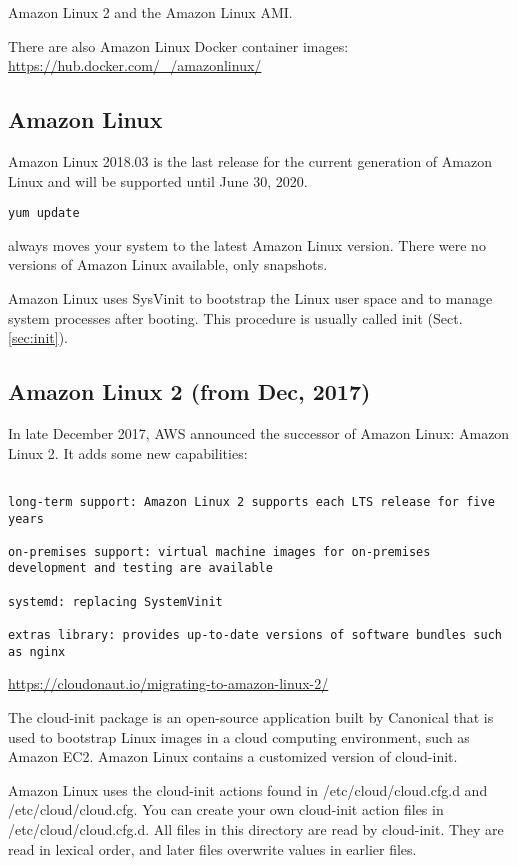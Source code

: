 Amazon Linux 2 and the Amazon Linux AMI. 

There are also  Amazon Linux Docker container images:
\url{https://hub.docker.com/_/amazonlinux/}

\subsection{Amazon Linux}

Amazon Linux 2018.03 is the last release for the current generation of Amazon
Linux and will be supported until June 30, 2020.

\begin{verbatim}
yum update 
\end{verbatim}
always moves your system to the latest Amazon Linux version.
There were no versions of Amazon Linux available, only snapshots.


Amazon Linux uses SysVinit to bootstrap the Linux user space and to manage
system processes after booting. This procedure is usually called init
(Sect.\ref{sec:init}).


\subsection{Amazon Linux 2 (from Dec, 2017)}

In late December 2017, AWS announced the successor of Amazon Linux: Amazon Linux 2.
It  adds some new capabilities:
\begin{verbatim}

long-term support: Amazon Linux 2 supports each LTS release for five years

on-premises support: virtual machine images for on-premises development and testing are available

systemd: replacing SystemVinit

extras library: provides up-to-date versions of software bundles such as nginx
\end{verbatim}
\url{https://cloudonaut.io/migrating-to-amazon-linux-2/}

The cloud-init package is an open-source application built by Canonical that is
used to bootstrap Linux images in a cloud computing environment, such as Amazon
EC2. Amazon Linux contains a customized version of cloud-init.

Amazon Linux uses the cloud-init actions found in /etc/cloud/cloud.cfg.d and
/etc/cloud/cloud.cfg. You can create your own cloud-init action files in
/etc/cloud/cloud.cfg.d. All files in this directory are read by cloud-init. They
are read in lexical order, and later files overwrite values in earlier files.



